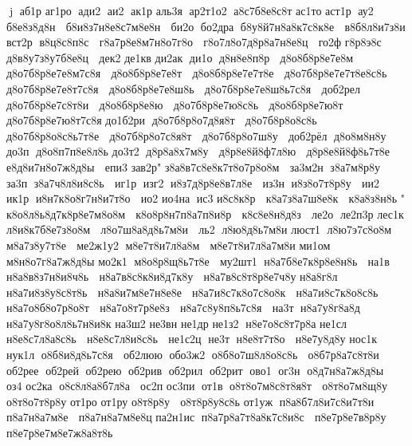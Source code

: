 j  аб1р 
 аг1ро  ади2  аи2  ак1р 
 аль3я  ар2т1о2  а8с7б8е8с8т  
 ас1то 
 аст1р  ау2  б8е8з8д8н   б8и8з7н8е8с7м8е8н   би2о  бо2дра  б8у8й7н8а8к7с8к8е   в8б8л8и7з8и  %
 вст2р  в8ц8с8п8с   г8а7р8е8м7н8о7г8о   г8о7л8о7д8р8а7н8е8ц   го2ф 
 г8р8э8с   д8в8у7з8у7б8е8ц   дек2 
 де1кв 
 ди2ак  ди1о  д8н8е8п8р   д8о8б8р8е7е8м   д8о7б8р8е7е8м7с8я   д8о8б8р8е7е8т   д8о8б8р8е7е7т8е   д8о7б8р8е7е7т8е8с8ь   д8о7б8р8е7е8т7с8я   д8о8б8р8е7е8ш8ь   д8о7б8р8е7е8ш8ь7с8я   доб2рел  д8о7б8р8е7с8т8и   д8о8б8р8е8ю   д8о7б8р8е7ю8с8ь   д8о8б8р8е7ю8т   д8о7б8р8е7ю8т7с8я  
 до1б2ри  д8о7б8р8о7д8я8т   д8о7б8р8о8с8ь   д8о7б8р8о8с8ь7т8е   д8о7б8р8о7с8я8т   д8о7б8р8о7ш8у   доб2рёл  д8о8м8н8у   до3п  д8о8п7п8е8л8ь  	 до3т2  д8р8а8х7м8у   д8р8е8й8ф7л8ю   д8р8е8й8ф8ь7т8е   е8д8и7н8о7ж8д8ы   епи3 
 зав2р " з8а8в7с8е8к7т8о7р8о8м   за3м2н  з8а7м8р8у   за3п  з8а7ч8л8и8с8ь   иг1р  изг2  и8з7д8р8е8в7л8е   из3н  и8з8о7т8р8у   ии2  ик1р  и8н7к8о8г7н8и7т8о   ио2 
 ио4на  ис3 
 и8с8к8р   к8а7з8а7ш8е8к   к8а8з8н8ь  " к8о8л8ь8д7к8р8е7м8о8м   к8о8р8н7п8а7п8и8р   к8с8е8н8д8з   ле2о  ле2п3р 
 лес1к  л8и8к7б8е7з8о8м   л8о7ш8а8д8ь7м8и   ль2  л8ю8д8ь7м8и  
 люст1  л8ю7э7с8о8м   м8а7з8у7т8е   ме2ж1у2  м8е7т8и7л8а8м   м8е7т8и7л8а7м8и  
 ми1ом  м8н8о7г8а7ж8д8ы  	 мо2к1  м8о8р8щ8ь7т8е   му2шт1  н8а7б8е7к8р8е8н8ь   на1в  н8а8в8з7н8и8ч8ь   н8а7в8с8к8и8д7к8у   н8а7в8с8т8р8е7ч8у  
 н8а8г8л   н8а7и8з8у8с8т8ь   н8а8и7м8е7н8е8е   н8а7и8с7к8о7с8о8к   н8а7и8с7к8о8с8ь   н8а7о8б8о7р8о8т   н8а7о8т7р8е8з   н8а7с8у8п8ь7с8я   на3т  н8а7у8г8а8д   н8а7у8г8о8л8ь7н8и8к  	 на3ш2 
 не3вн 
 не1др 	 не1з2  н8е7о8с8т7р8а  
 не1сл  н8е8с7л8а8с8ь   н8е8с7л8и8с8ь   не1с2ц  не3т  н8е8т7т8о   н8е7у8д8у  
 нос1к 
 нук1л  о8б8и8д8ь7с8я   об2люю  обо3ж2  о8б8о7ш8л8о8с8ь   о8б7р8а7с8т8и   об2рее  об2рей  об2рею  об2рив  об2рил  об2рит  ово1  ог3н  о8д7н8а7ж8д8ы   оз4 
 ос2ка  о8с8л8а8б7л8а   ос2п 
 ос3пи  от1в  о8т8о7м8с8т8я8т   о8т8о7м8щ8у   о8т8о7т8р8у  
 от1ро 
 от1ру 
 о8т8р8у   о8т8р8у8с8ь  
 от1уж  п8а8б7л8и7с8и7т8и   п8а7н8а7м8е   п8а7н8а7м8е8ц  
 па2н1ис  п8а7р8а7т8а8к7с8и8с   п8е7р8е7в8р8у   п8е7р8е7м8е7ж8а8т8ь  %
